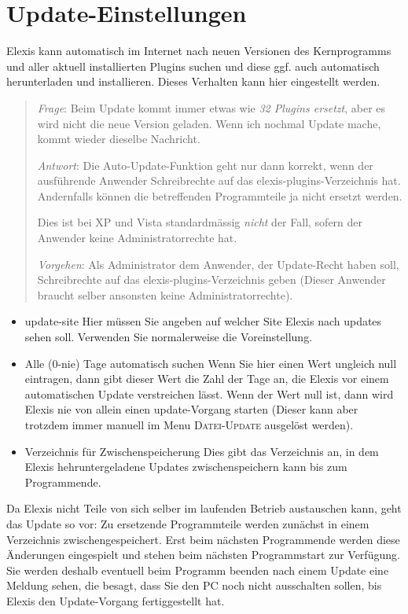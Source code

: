\section{Update-Einstellungen}
Elexis kann automatisch im Internet nach neuen Versionen des Kernprogramms und aller aktuell installierten Plugins suchen und diese ggf. auch automatisch herunterladen und installieren. Dieses Verhalten kann hier eingestellt werden.

\begin{quote}
 \textit{Frage}: Beim Update kommt immer etwas wie \textit{32 Plugins ersetzt}, aber es wird nicht die neue Version geladen. Wenn ich nochmal Update mache, kommt wieder dieselbe Nachricht.


 \textit{Antwort}: Die Auto-Update-Funktion geht nur dann korrekt, wenn der ausführende Anwender Schreibrechte auf das elexis-plugins-Verzeichnis hat. Andernfalls können die betreffenden Programmteile ja nicht ersetzt werden.

Dies ist bei XP und Vista standardmässig \textit{nicht} der Fall, sofern der Anwender keine Administratorrechte hat.

\textit{Vorgehen}: Als Administrator dem Anwender, der Update-Recht haben soll, Schreibrechte auf das elexis-plugins-Verzeichnis geben (Dieser Anwender braucht selber ansonsten keine Administratorrechte).
\end{quote}

\begin{itemize}
\item{update-site} Hier müssen Sie angeben auf welcher Site Elexis nach updates sehen soll. Verwenden Sie normalerweise die Voreinstellung.
\item{Alle (0-nie) Tage automatisch suchen} Wenn Sie hier einen Wert ungleich null eintragen, dann gibt dieser Wert die Zahl der Tage an, die Elexis vor einem automatischen Update verstreichen lässt. Wenn der Wert null ist, dann wird Elexis nie von allein einen update-Vorgang starten (Dieser kann aber trotzdem immer manuell im Menu \textsc{Datei-Update} ausgelöst werden).
\item{Verzeichnis für Zwischenspeicherung} Dies gibt das Verzeichnis an, in dem Elexis hehruntergeladene Updates zwischenspeichern kann bis zum Programmende.
\end{itemize}
Da Elexis nicht Teile von sich selber im laufenden Betrieb austauschen kann, geht das Update so vor: Zu ersetzende Programmteile werden zunächst in einem Verzeichnis zwischengespeichert. Erst beim nächsten Programmende werden diese Änderungen eingespielt und stehen beim nächsten Programmstart zur Verfügung. Sie werden deshalb eventuell beim Programm beenden nach einem Update eine Meldung sehen, die besagt, dass Sie den PC noch nicht ausschalten sollen, bis Elexis den Update-Vorgang fertiggestellt hat.
